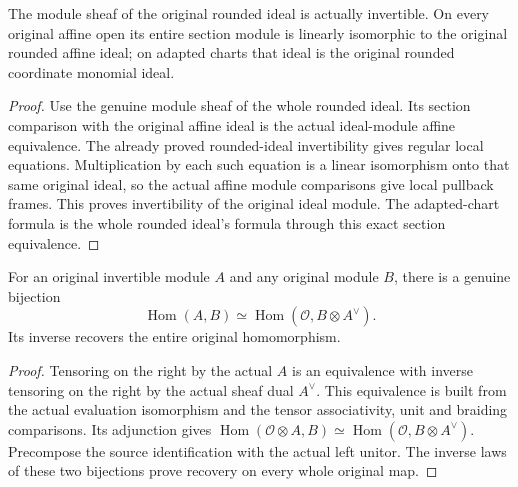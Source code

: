 \begin{lemma}
\label{lem:rounded-snc-original-module}
\leanok
The module sheaf of the original rounded ideal is actually invertible.
On every original affine open its entire section module is linearly
isomorphic to the original rounded affine ideal; on adapted charts that
ideal is the original rounded coordinate monomial ideal.
\end{lemma}
\begin{proof}
Use the genuine module sheaf of the whole rounded ideal. Its section
comparison with the original affine ideal is the actual ideal-module
affine equivalence. The already proved rounded-ideal invertibility gives
regular local equations. Multiplication by each such equation is a
linear isomorphism onto that same original ideal, so the actual affine
module comparisons give local pullback frames. This proves invertibility
of the original ideal module. The adapted-chart formula is the whole
rounded ideal's formula through this exact section equivalence.
\end{proof}

\begin{lemma}
\label{lem:original-invertible-hom-section}
\leanok
For an original invertible module $A$ and any original module $B$, there
is a genuine bijection
\[
 \operatorname{Hom}(A,B)\simeq
 \operatorname{Hom}(\mathcal O,B\otimes A^\vee).
\]
Its inverse recovers the entire original homomorphism.
\end{lemma}
\begin{proof}
Tensoring on the right by the actual $A$ is an equivalence with inverse
tensoring on the right by the actual sheaf dual $A^\vee$. This equivalence
is built from the actual evaluation isomorphism and the tensor
associativity, unit and braiding comparisons. Its adjunction gives
$\operatorname{Hom}(\mathcal O\otimes A,B)\simeq
\operatorname{Hom}(\mathcal O,B\otimes A^\vee)$. Precompose the source
identification with the actual left unitor. The inverse laws of these two
bijections prove recovery on every whole original map.
\end{proof}

